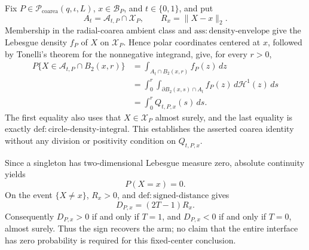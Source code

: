 Fix \(P\in\mathcal P_{\mathrm{coarea}}(q,\iota,L)\), \(x\in\mathcal B_P\), and \(t\in\{0,1\}\), and put
\[
A_t=\mathcal A_{t,P}\cap\mathcal X_P,
\qquad R_x=\lVert X-x\rVert_2.
\]
Membership in the radial-coarea ambient class and \(\mathrm{ass:density\text{-}envelope}\) give the Lebesgue density \(f_P\) of \(X\) on \(\mathcal X_P\).  Hence polar coordinates centered at \(x\), followed by Tonelli's theorem for the nonnegative integrand, give, for every \(r>0\),
\[
\begin{aligned}
P\{X\in\mathcal A_{t,P}\cap B_2(x,r)\}
&=\int_{A_t\cap B_2(x,r)}f_P(z)\,dz\\
&=\int_0^r\int_{\partial B_2(x,s)\cap A_t}
f_P(z)\,d\mathcal H^1(z)\,ds\\
&=\int_0^r Q_{t,P,x}(s)\,ds.
\end{aligned}
\]
The first equality also uses that \(X\in\mathcal X_P\) almost surely, and the last equality is exactly \(\mathrm{def:circle\text{-}density\text{-}integral}\).  This establishes the asserted coarea identity without any division or positivity condition on \(Q_{t,P,x}\).

Since a singleton has two-dimensional Lebesgue measure zero, absolute continuity yields
\[
P(X=x)=0.
\]
On the event \(\{X\ne x\}\), \(R_x>0\), and \(\mathrm{def:signed\text{-}distance}\) gives
\[
D_{P,x}=(2T-1)R_x.
\]
Consequently \(D_{P,x}>0\) if and only if \(T=1\), and \(D_{P,x}<0\) if and only if \(T=0\), almost surely.  Thus the sign recovers the arm; no claim that the entire interface has zero probability is required for this fixed-center conclusion.

